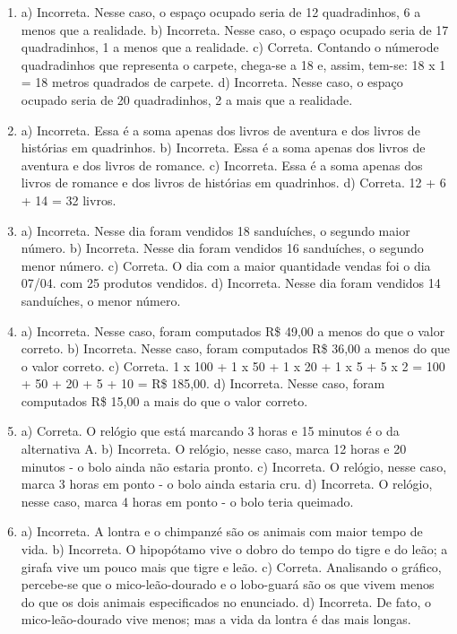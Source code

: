 \begin{enumerate}
\item
a) Incorreta. Nesse caso, o espaço ocupado seria de 12 quadradinhos, 6 a menos que a realidade.
b) Incorreta. Nesse caso, o espaço ocupado seria de 17 quadradinhos, 1 a menos que a realidade.
c) Correta. Contando o númerode quadradinhos que representa o carpete, chega-se a 18 e,
assim, tem-se: 18 x 1 = 18 metros quadrados de carpete.
d) Incorreta. Nesse caso, o espaço ocupado seria de 20 quadradinhos, 2 a mais que a realidade.

\item
a) Incorreta. Essa é a soma apenas dos livros de aventura e dos livros de histórias em quadrinhos.
b) Incorreta. Essa é a soma apenas dos livros de aventura e dos livros de romance.
c) Incorreta. Essa é a soma apenas dos livros de romance e dos livros de histórias em quadrinhos.
d) Correta. 12 + 6 + 14 = 32 livros.

\item
a) Incorreta. Nesse dia foram vendidos 18 sanduíches, o segundo maior número.
b) Incorreta. Nesse dia foram vendidos 16 sanduíches, o segundo menor número.
c) Correta. O dia com a maior quantidade vendas foi o dia 07/04. com 25 produtos vendidos.
d) Incorreta. Nesse dia foram vendidos 14 sanduíches, o menor número.

\item
a) Incorreta. Nesse caso, foram computados R\$ 49,00 a menos do que o valor correto.
b) Incorreta. Nesse caso, foram computados R\$ 36,00 a menos do que o valor correto.
c) Correta. 1 x 100 + 1 x 50 + 1 x 20 + 1 x 5 + 5 x 2 = 100 + 50 + 20 + 5 + 10 = R\$ 185,00.
d) Incorreta. Nesse caso, foram computados R\$ 15,00 a mais do que o valor correto.

\item
a) Correta. O relógio que está marcando 3 horas e 15 minutos é o da alternativa A.
b) Incorreta. O relógio, nesse caso, marca 12 horas e 20 minutos - o bolo ainda não estaria pronto.
c) Incorreta. O relógio, nesse caso, marca 3 horas em ponto - o bolo ainda estaria cru.
d) Incorreta. O relógio, nesse caso, marca 4 horas em ponto - o bolo teria queimado.

\item
a) Incorreta. A lontra e o chimpanzé são os animais com maior tempo de vida.
b) Incorreta. O hipopótamo vive o dobro do tempo do tigre e do leão; a girafa vive um pouco mais que tigre e leão.
c) Correta. Analisando o gráfico, percebe-se que o mico-leão-dourado e o lobo-guará são os que vivem menos do que os dois animais especificados no enunciado.
d) Incorreta. De fato, o mico-leão-dourado vive menos; mas a vida da lontra é das mais longas.


\end{enumerate}
